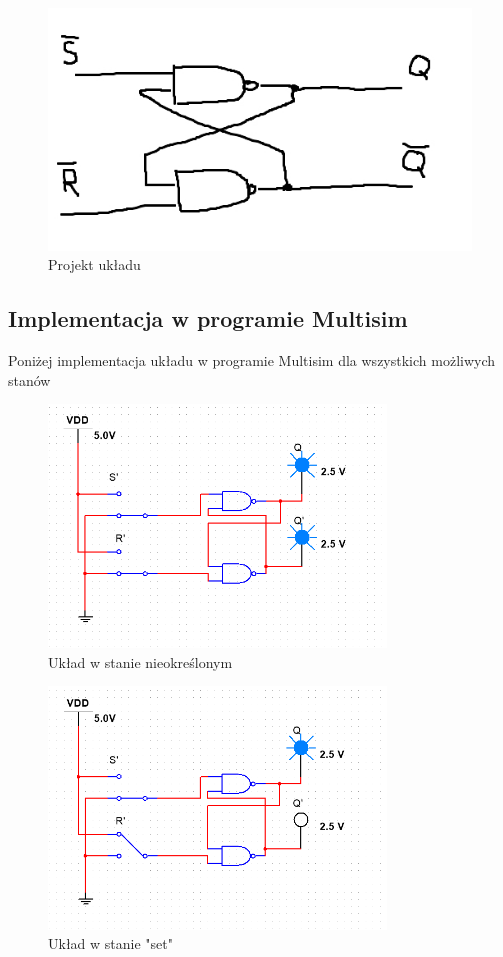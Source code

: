 \documentclass{article}
\begin{document}
\begin{figure}[H]
    \centering
    \includegraphics[width=\textwidth]{wypr_rs3.jpg}
    \caption{Projekt układu}
\end{figure}

\subsection{Implementacja w programie Multisim}
Poniżej implementacja układu w programie Multisim dla wszystkich możliwych stanów

\begin{figure}[H]
    \centering
    \includegraphics[width=0.8\textwidth]{rs_niokr.png}
    \caption{Układ w stanie nieokreślonym}
\end{figure}

\begin{figure}[H]
    \centering
    \includegraphics[width=0.8\textwidth]{rs_Q.png}
    \caption{Układ w stanie "set"}
\end{figure}
\end{document}
